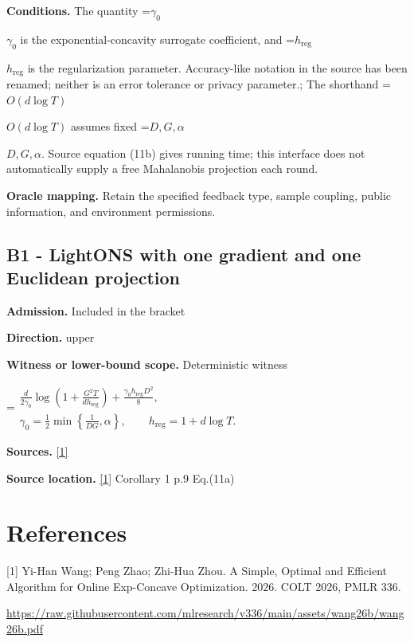 \documentclass[10pt,a4paper]{article}
\newcommand{\AtlasMath}[1]{\par\begingroup\centering\setbox0=\hbox{$\displaystyle #1$}\ifdim\wd0>1.4\linewidth\typeout{ATLAS WIDE FORMULA: \the\wd0}\fi\ifdim\wd0>\linewidth\resizebox{\linewidth}{!}{\box0}\else\box0\fi\par\endgroup}
\newcommand{\AtlasInlineMath}[1]{\begingroup\setbox0=\hbox{$#1$}\ifdim\wd0>.4\linewidth\endgroup\AtlasMath{#1}\else\endgroup$#1$\fi}
\begin{document}
\textbf{Conditions.} The quantity \AtlasInlineMath{\gamma_0} is the exponential-concavity surrogate coefficient, and \AtlasInlineMath{h_{\mathrm{reg}}} is the regularization parameter. Accuracy-like notation in the source has been renamed; neither is an error tolerance or privacy parameter.; The shorthand \AtlasInlineMath{O(d\log T)} assumes fixed \AtlasInlineMath{D,G,\alpha}. Source equation (11b) gives running time; this interface does not automatically supply a free Mahalanobis projection each round.

\textbf{Oracle mapping.} Retain the specified feedback type, sample coupling, public information, and environment permissions.

\subsection{B1 - LightONS with one gradient and one Euclidean projection}
\textbf{Admission.} Included in the bracket

\textbf{Direction.} upper

\textbf{Witness or lower-bound scope.} Deterministic witness

\AtlasMath{\begin{gathered}\frac d{2\gamma_0}\log\!\left(1+\frac{G^2T}{dh_{\mathrm{reg}}}\right)+\frac{\gamma_0h_{\mathrm{reg}}D^2}{8},\\ \gamma_0=\frac12\min\!\left\{\frac1{DG},\alpha\right\},\qquad h_{\mathrm{reg}}=1+d\log T.\end{gathered}}
\textbf{Sources.} \href{https://raw.githubusercontent.com/mlresearch/v336/main/assets/wang26b/wang26b.pdf}{[1]}

\textbf{Source location.} \href{https://raw.githubusercontent.com/mlresearch/v336/main/assets/wang26b/wang26b.pdf}{[1]} Corollary 1 p.9 Eq.(11a)

\section{References}
[1] Yi-Han Wang; Peng Zhao; Zhi-Hua Zhou. A Simple, Optimal and Efficient Algorithm for Online Exp-Concave Optimization. 2026. COLT 2026, PMLR 336.

\url{https://raw.githubusercontent.com/mlresearch/v336/main/assets/wang26b/wang26b.pdf}
\end{document}
